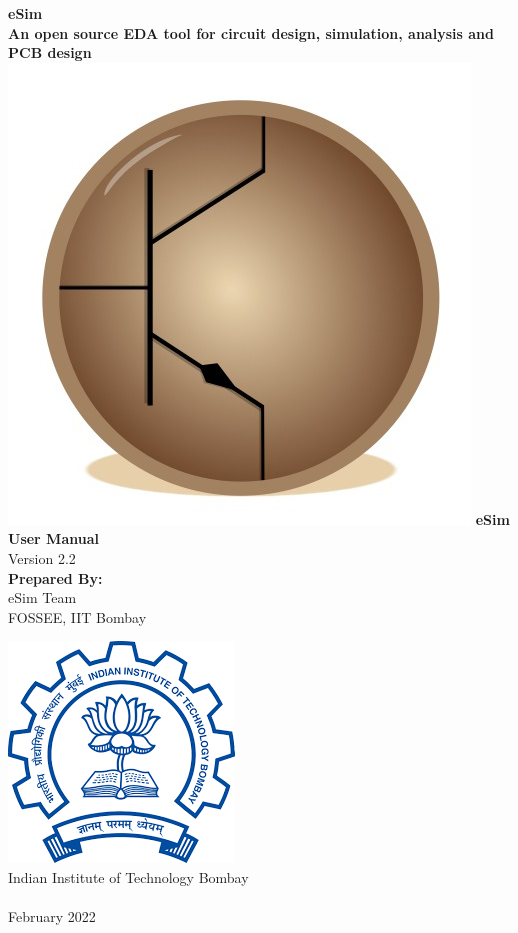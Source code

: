 \begin{center}
{\bf {\Huge eSim} \\ [0.1in]
\LARGE An open source EDA tool for circuit design,
  simulation, analysis and PCB design} \\
\vfill
\includegraphics[width=0.3\linewidth]{logo-trimmed.png}
\vfill
\LARGE \textbf{eSim User Manual} \\ 
\small{Version 2.2}\\
\vspace{1cm}
\textbf{Prepared By:}\\
eSim Team\\
FOSSEE, IIT Bombay

\vspace{1cm}
\includegraphics[width=0.2\linewidth]{iitblogo.png} \\
Indian Institute of Technology Bombay \\ [2mm]
{\LARGE \byncnd} \\ [1mm]
February 2022
\end{center}



\cleardoublepage
